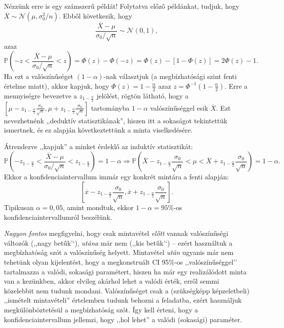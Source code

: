 \documentclass[]{book}
\begin{document}
Nézzünk erre is egy számszerű példát! Folytatva előző példánkat, tudjuk, hogy \(\overline{X} \sim \mathcal{N}\left(\mu,\sigma_0^2/n\right)\). Ebből következik, hogy
\[
    \frac{\overline{X}-\mu}{\sigma_0/\sqrt{n}}\sim\mathcal{N}\left(0,1\right),
\]
azaz
\[
    \mathbb{P}\left(-z<\frac{\overline{X}-\mu}{\sigma_0/\sqrt{n}}<z\right)=\Phi\left(z\right)-\Phi\left(-z\right)=\Phi\left(z\right)-\left[1-\Phi\left(z\right)\right]=2\Phi\left(z\right)-1.
\]
Ha ezt a valószínűséget \(\left(1-\alpha\right)\)-nak választjuk (a megbízhatósági szint fenti értelme miatt), akkor kapjuk, hogy \(\Phi\left(z\right)=1-\frac{\alpha}{2}\) azaz \(z=\Phi^{-1}\left(1-\frac{\alpha}{2}\right)\). Erre a mennyiségre bevezetve a \(z_{1-\frac{\alpha}{2}}\) jelölést, rögtön látható, hogy a \(\left[\mu-z_{1-\frac{\alpha}{2}}\frac{\sigma_0}{\sqrt{n}},\mu+z_{1-\frac{\alpha}{2}}\frac{\sigma_0}{\sqrt{n}}\right]\) tartományba \(1-\alpha\) valószínűséggel esik \(\overline{X}\). Ezt nevezhetnénk ,,deduktív statisztikának'', hiszen itt a sokaságot tekintettük ismertnek, és ez alapján következtettünk a minta viselkedésére.

Átrendezve ,,kapjuk'' a minket érdeklő az induktív statisztikát:
\[
    \mathbb{P}\left(-z_{1-\frac{\alpha}{2}}<\frac{\overline{X}-\mu}{\sigma_0/\sqrt{n}}<z_{1-\frac{\alpha}{2}}\right)=1-\alpha \Rightarrow \mathbb{P}\left(\overline{X}-z_{1-\frac{\alpha}{2}}\frac{\sigma_0}{\sqrt{n}}<\mu<\overline{X}+z_{1-\frac{\alpha}{2}}\frac{\sigma_0}{\sqrt{n}}\right)=1-\alpha.
\]
Ekkor a konfidenciaintervallum immár egy konkrét mintára a fenti alapján:
\[
    \left[\overline{x}-z_{1-\frac{\alpha}{2}}\frac{\sigma_0}{\sqrt{n}},\overline{x}+z_{1-\frac{\alpha}{2}}\frac{\sigma_0}{\sqrt{n}}\right].
\]
Tipikusan \(\alpha=0,\!05\), amint mondtuk, ekkor \(1-\alpha=95\)\%-os konfidenciaintervallumról beszélünk.

\emph{Nagyon fontos} megfigyelni, hogy csak mintavétel \emph{előtt} vannak valószínűségi változók (,,nagy betűk'`), \emph{utána} már nem (,,kis betűk'`) -- ezért használtuk a megbízhatóság szót a valószínűség helyett. Mintavétel \emph{után} ugyanis már nem tehetünk olyan kijelentést, hogy a megkonstruált CI 95\%-os ,,valószínűséggel'' tartalmazza a valódi, sokasági paramétert, hiszen ha már egy realizálódott minta van a kezünkben, akkor elvileg akárhol lehet a valódi érték, erről semmi közelebbit nem tudunk mondani. Valószínűséget csak a (szükségképp képzeletbeli) ,,ismételt mintavételi'' értelemben tudunk behozni a feladatba, ezért használjuk megkülönböztetésül a megbízhatóság szót. Így kell érteni, hogy a konfidenciaintervallum jellemzi, hogy ,,hol lehet'' a valódi (sokasági) paraméter.
\end{document}
